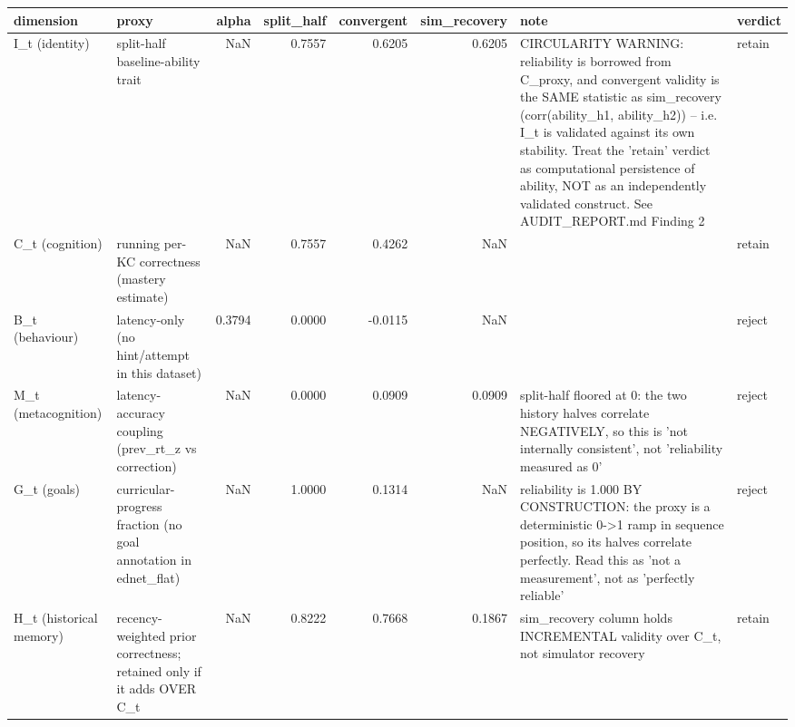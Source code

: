 \begin{tabular}{llrrrrll}
\toprule
dimension & proxy & alpha & split\_half & convergent & sim\_recovery & note & verdict \\
\midrule
I\_t (identity) & split-half baseline-ability trait & NaN & 0.7557 & 0.6205 & 0.6205 & CIRCULARITY WARNING: reliability is borrowed from C\_proxy, and convergent validity is the SAME statistic as sim\_recovery (corr(ability\_h1, ability\_h2)) -- i.e. I\_t is validated against its own stability. Treat the 'retain' verdict as computational persistence of ability, NOT as an independently validated construct. See AUDIT\_REPORT.md Finding 2 & retain \\
C\_t (cognition) & running per-KC correctness (mastery estimate) & NaN & 0.7557 & 0.4262 & NaN &  & retain \\
B\_t (behaviour) & latency-only (no hint/attempt in this dataset) & 0.3794 & 0.0000 & -0.0115 & NaN &  & reject \\
M\_t (metacognition) & latency-accuracy coupling (prev\_rt\_z vs correction) & NaN & 0.0000 & 0.0909 & 0.0909 & split-half floored at 0: the two history halves correlate NEGATIVELY, so this is 'not internally consistent', not 'reliability measured as 0' & reject \\
G\_t (goals) & curricular-progress fraction (no goal annotation in ednet\_flat) & NaN & 1.0000 & 0.1314 & NaN & reliability is 1.000 BY CONSTRUCTION: the proxy is a deterministic 0->1 ramp in sequence position, so its halves correlate perfectly. Read this as 'not a measurement', not as 'perfectly reliable' & reject \\
H\_t (historical memory) & recency-weighted prior correctness; retained only if it adds OVER C\_t & NaN & 0.8222 & 0.7668 & 0.1867 & sim\_recovery column holds INCREMENTAL validity over C\_t, not simulator recovery & retain \\
\bottomrule
\end{tabular}
